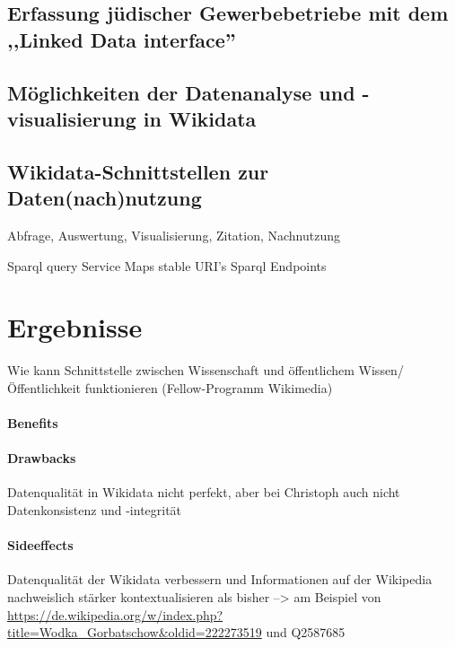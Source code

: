 \subsection{Erfassung jüdischer Gewerbebetriebe mit dem ,,Linked Data interface''}

\subsection{Möglichkeiten der Datenanalyse und -visualisierung in Wikidata}

\subsection{Wikidata-Schnittstellen zur Daten(nach)nutzung}

Abfrage, Auswertung, Visualisierung, Zitation, Nachnutzung

Sparql query Service
Maps
stable URI's
Sparql Endpoints

\section{Ergebnisse}

Wie kann Schnittstelle zwischen Wissenschaft und öffentlichem Wissen/ Öffentlichkeit funktionieren (Fellow-Programm Wikimedia)

\paragraph{Benefits}

\paragraph{Drawbacks}

Datenqualität in Wikidata nicht perfekt, aber bei Christoph auch nicht
Datenkonsistenz und -integrität

\paragraph{Sideeffects}

Datenqualität der Wikidata verbessern und Informationen auf der Wikipedia nachweislich stärker kontextualisieren als bisher
--> am Beispiel von \url{https://de.wikipedia.org/w/index.php?title=Wodka_Gorbatschow&oldid=222273519} und Q2587685